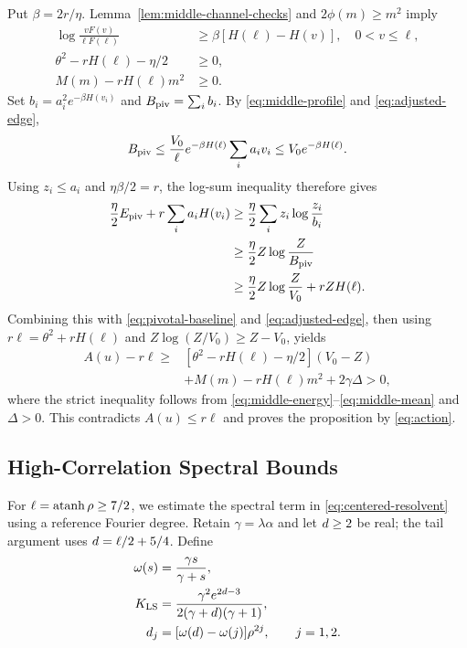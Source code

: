 Put \(\beta=2r/\eta\). Lemma~\ref{lem:middle-channel-checks} and
\(2\phi(m)\ge m^2\) imply
\begin{align}
 \log\frac{vF(v)}{\ell F(\ell)}
 &\ge\beta[H(\ell)-H(v)],\quad 0<v\le\ell,
 \label{eq:middle-profile}\\
 \theta^2-rH(\ell)-\eta/2&\ge0,
 \label{eq:middle-energy}\\
 M(m)-rH(\ell)m^2&\ge0.
 \label{eq:middle-mean}
\end{align}
Set \(b_i=a_i^2e^{-\beta H(v_i)}\) and
\(B_{\rm piv}=\sum_i b_i\). By \eqref{eq:middle-profile} and
\eqref{eq:adjusted-edge},
\[
 B_{\rm piv}\le
 \frac{V_0}{\ell}e^{-\beta H(\ell)}\sum_i a_iv_i
 \le V_0e^{-\beta H(\ell)}.
\]
Using \(z_i\le a_i\) and \(\eta\beta/2=r\), the log-sum inequality
therefore gives
\begin{align*}
 \frac\eta2 E_{\rm piv}+r\sum_i a_iH(v_i)
 &\ge\frac\eta2\sum_i z_i\log\frac{z_i}{b_i}\\
 &\ge\frac\eta2 Z\log\frac Z{B_{\rm piv}}\\
 &\ge\frac\eta2 Z\log\frac Z{V_0}+rZH(\ell).
\end{align*}
Combining this with \eqref{eq:pivotal-baseline} and
\eqref{eq:adjusted-edge}, then using
\(r\ell=\theta^2+rH(\ell)\) and
\(Z\log(Z/V_0)\ge Z-V_0\), yields
\[
 \begin{aligned}
 A(u)-r\ell\ge{}&
 [\theta^2-rH(\ell)-\eta/2](V_0-Z)\\
 &+M(m)-rH(\ell)m^2+2\gamma\Delta>0,
 \end{aligned}
\]
where the strict inequality follows from
\eqref{eq:middle-energy}--\eqref{eq:middle-mean} and \(\Delta>0\).
This contradicts \(A(u)\le r\ell\) and proves the proposition by
\eqref{eq:action}.


\subsection{High-Correlation Spectral Bounds}
\label{sec:coordinate}

For \(\ell=\operatorname{atanh}\rho\ge7/2\), we estimate the spectral term in
\eqref{eq:centered-resolvent} using a reference Fourier degree.
Retain \(\gamma=\lambda\alpha\) and let \(d\ge2\) be real;
the tail argument uses \(d=\ell/2+5/4\). Define
\begin{align*}
 \omega(s)&=\frac{\gamma s}{\gamma+s},\\
 K_{\mathrm{LS}}&=\frac{\gamma^2e^{2d-3}}
              {2(\gamma+d)(\gamma+1)},\\
 d_j&=[\omega(d)-\omega(j)]\rho^{2j},
       \qquad j=1,2.
\end{align*}

